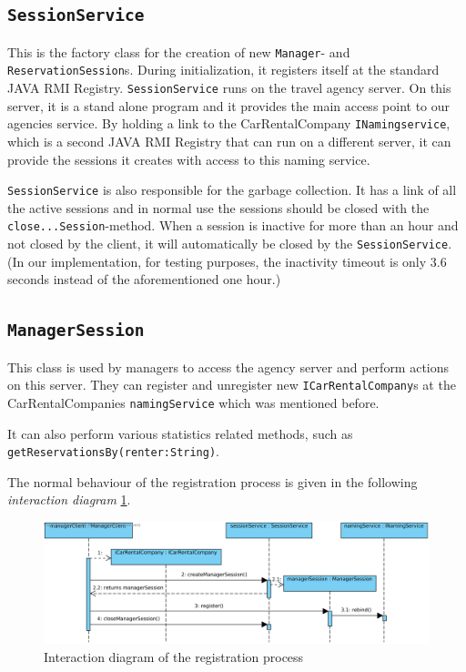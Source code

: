 \documentclass[a4paper]{article}
\begin{document}
\subsection{\texttt{SessionService}}
This is the factory class for the creation of new \texttt{Manager}- and \texttt{ReservationSession}s. During initialization, it registers itself at the standard JAVA RMI Registry. \texttt{SessionService} runs on the travel agency server. On this server, it is a stand alone program and it provides the main access point to our agencies service. By holding a link to the CarRentalCompany \texttt{INamingservice}, which is a second JAVA RMI Registry that can run on a different server, it can provide the sessions it creates with access to this naming service.

\texttt{SessionService} is also responsible for the garbage collection. It has a link of all the active sessions and in normal use the sessions should be closed with the \texttt{close...Session}-method. When a session is inactive for more than an hour and not closed by the client, it will automatically be closed by the \texttt{SessionService}.
(In our implementation, for testing purposes, the inactivity timeout is only 3.6 seconds instead of the aforementioned one hour.)

\subsection{\texttt{ManagerSession}}
This class is used by managers to access the agency server and perform actions on this server. They can register and unregister new \texttt{ICarRentalCompany}s at the CarRentalCompanies \texttt{namingService} which was mentioned before. 

It can also perform various statistics related methods, such as \texttt{getReservationsBy(renter:String)}. 

The normal behaviour of the registration process is given in the following \emph{interaction diagram} \ref{fig:activity_carrentalregistration}.
\begin{figure}[hbtp]
\centering
\includegraphics[width=\textwidth]{img/CarRentalCompany registration process.png}
\caption{Interaction diagram of the registration process}
\label{fig:activity_carrentalregistration}
\end{figure}
\end{document}
